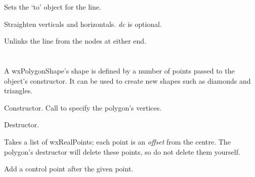 

Sets the `to' object for the line.



Straighten verticals and horizontals. {\it dc} is optional.



Unlinks the line from the nodes at either end.

\section{}\label{wxpolygonshape}

A wxPolygonShape's shape is defined by a number of points passed to the object's
constructor. It can be used to create new shapes such as diamonds and triangles.






Constructor. Call  to specify the polygon's vertices.



Destructor.

\label{wxpolygonshapecreate}


Takes a list of wxRealPoints; each point is an {\it offset} from the centre.
The polygon's destructor will delete these points, so do not delete them yourself.



Add a control point after the given point.

